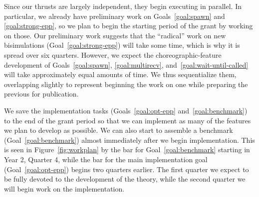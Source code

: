 Since our thrusts are largely independent, they begin executing in parallel.
In particular, we already have preliminary work on Goals~\ref{goal:spawn} and \ref{goal:strong-epp}, so we plan to begin the starting period of the grant by working on those.
Our preliminary work suggests that the ``radical'' work on new bisimulations (Goal~\ref{goal:strong-epp}) will take some time, which is why it is spread over six quarters.
However, we expect the choreographic-feature development of Goals~\ref{goal:spawn}, \ref{goal:multirecv}, and~\ref{goal:wait-until-called} will take approximately equal amounts of time.
We thus sequentialize them, overlapping slightly to represent beginning the work on one while preparing the previous for publication.

We save the implementation tasks (Goals~\ref{goal:opt-epp} and~\ref{goal:benchmark}) to the end of the grant period so that we can implement as many of the features we plan to develop as possible.
We can also start to assemble a benchmark (Goal~\ref{goal:benchmark}) almost immediately after we begin implementation.
This is seen in Figure~\ref{fig:workplan} by the bar for Goal~\ref{goal:benchmark} starting in Year 2, Quarter 4, while the bar for the main implementation goal (Goal~\ref{goal:opt-epp}) begins two quarters earlier.
The first quarter we expect to be fully devoted to the development of the theory, while the second quarter we will begin work on the implementation.

